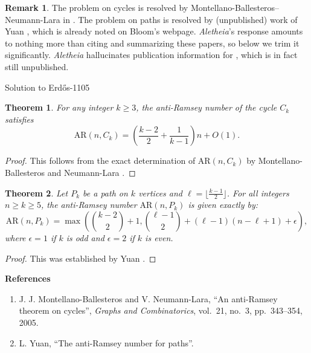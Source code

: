 \documentclass{article}
\theoremstyle{plain}
\newtheorem{theorem}{Theorem}
\theoremstyle{definition}
\newtheorem{remark}{Remark}[section]
\newcommand{\Aletheia}{\emph{Aletheia}}
\begin{document}
\begin{remark}
    The problem on cycles is resolved by Montellano-Ballesteros--Neumann-Lara in \cite{MBNL05}. 
    The problem on paths is resolved by (unpublished) work of Yuan \cite{Yuan21}, which is already noted on Bloom's webpage. {\Aletheia}'s response amounts to nothing more than citing and summarizing these papers, so below we trim it significantly. {\Aletheia} hallucinates publication information for \cite{Yuan21}, which is in fact still unpublished.
\end{remark}

\begin{solution}{Solution to Erdős-1105}

\begin{theorem}
    For any integer $k \ge 3$, the anti-Ramsey number of the cycle $C_k$ satisfies
    \[ \mathrm{AR}(n, C_k) = \left(\frac{k-2}{2} + \frac{1}{k-1}\right)n + O(1). \]
\end{theorem}

\begin{proof}This follows from the exact determination of $\mathrm{AR}(n, C_k)$ by Montellano-Ballesteros and Neumann-Lara \cite{MBNL05}.
\end{proof}

\begin{theorem}
    Let $P_k$ be a path on $k$ vertices and $\ell = \lfloor \frac{k-1}{2} \rfloor$. For all integers $n \ge k \ge 5$, the anti-Ramsey number $\mathrm{AR}(n, P_k)$ is given exactly by:
    \[ \mathrm{AR}(n, P_k) = \max\left(\binom{k-2}{2}+1, \binom{\ell-1}{2}+(\ell-1)(n-\ell+1)+\epsilon\right), \]
    where $\epsilon=1$ if $k$ is odd and $\epsilon=2$ if $k$ is even.
\end{theorem}

\begin{proof}
This was established by Yuan \cite{Yuan21}. 
\end{proof}

\textbf{References}
\begin{enumerate}
    \item\cite{MBNL05} J. J. Montellano-Ballesteros and V. Neumann-Lara, ``An anti-Ramsey theorem on cycles'',  \textit{Graphs and Combinatorics}, vol.~21, no.~3, pp.~343–354, 2005.
    
    \item\cite{Yuan21} L. Yuan, ``The anti-Ramsey number for paths''.
\end{enumerate}
\end{solution}
\end{document}
